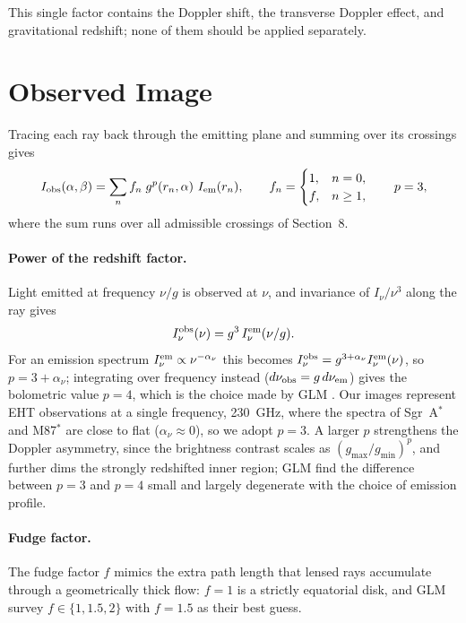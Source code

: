 \documentclass[11pt]{article}
\begin{document}
This single factor contains the Doppler shift, the transverse Doppler effect,
and gravitational redshift; none of them should be applied separately.

\section{Observed Image}

Tracing each ray back through the emitting plane and summing over its
crossings gives \cite{GLM2020}
\begin{equation}
I_{\rm obs}(\alpha,\beta) = \sum_{n} f_n\; g^p\!\left(r_n,\alpha\right)\, I_{\rm em}(r_n),
\qquad
f_n = \begin{cases} 1, & n = 0, \\ f, & n \ge 1, \end{cases}
\qquad p = 3,
\label{eq:Iobs}
\end{equation}
where the sum runs over all admissible crossings of Section~8.

\paragraph{Power of the redshift factor.} Light emitted at frequency
$\nu/g$ is observed at $\nu$, and invariance of $I_\nu/\nu^3$ along the ray
gives
\begin{equation}
I_\nu^{\rm obs}(\nu) = g^3\, I_\nu^{\rm em}(\nu/g).
\end{equation}
For an emission spectrum $I_\nu^{\rm em} \propto \nu^{-\alpha_\nu}$ this
becomes $I_\nu^{\rm obs} = g^{3+\alpha_\nu} I_\nu^{\rm em}(\nu)$, so
$p = 3 + \alpha_\nu$; integrating over frequency instead
($d\nu_{\rm obs} = g\,d\nu_{\rm em}$) gives the bolometric value $p = 4$, which
is the choice made by GLM \cite{GLM2020}. Our images represent EHT
observations at a single frequency, 230~GHz, where the spectra of Sgr~A$^*$
and M87$^*$ are close to flat ($\alpha_\nu \approx 0$), so we adopt $p = 3$.
A larger $p$ strengthens the Doppler asymmetry, since the brightness contrast
scales as $(g_{\max}/g_{\min})^p$, and further dims the strongly redshifted
inner region; GLM find the difference between $p = 3$ and $p = 4$ small and
largely degenerate with the choice of emission profile.

\paragraph{Fudge factor.} The fudge factor $f$ mimics the extra path length that lensed rays accumulate
through a geometrically thick flow: $f = 1$ is a strictly equatorial disk,
and GLM survey $f \in \{1, 1.5, 2\}$ with $f = 1.5$ as their best guess.
\end{document}
